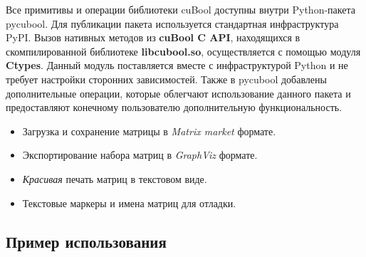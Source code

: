 Все примитивы и операции библиотеки cuBool доступны внутри Python-пакета pycubool.
Для публикации пакета используется стандартная инфраструктура PyPI.
Вызов нативных методов из \textbf{cuBool C API}, находящихся в скомпилированной библиотеке \textbf{libcubool.so}, осуществляется с помощью модуля \textbf{Ctypes}. 
Данный модуль поставляется вместе с инфраструктурой Python и не требует настройки сторонних зависимостей. 
Также в pycubool добавлены дополнительные операции, которые облегчают использование данного пакета и предоставляют конечному пользователю дополнительную функциональность.

\begin{itemize}[noitemsep,topsep=0pt,parsep=0pt,partopsep=0pt]
    \item Загрузка и сохранение матрицы в \textit{Matrix market} формате.
    \item Экспортирование набора матриц в \textit{GraphViz} формате.
    \item \textit{Красивая} печать матриц в текстовом виде.
    \item Текстовые маркеры и имена матриц для отладки.
\end{itemize}

\subsection{Пример использования}



\lstset{style=codelistingstyle}

